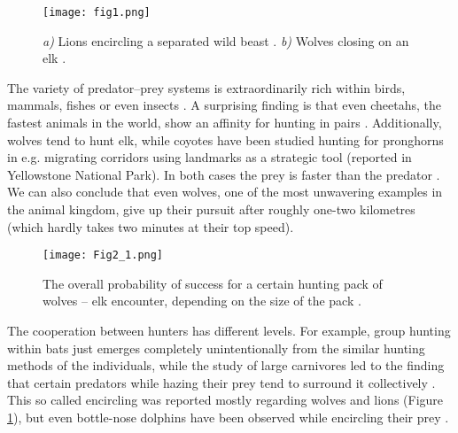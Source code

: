\documentclass[12pt,a4paper,final]{iopart}
\begin{document}
\begin{figure}
\begin{center}
\texttt{[image: fig1.png]}
\caption{{\it a)} Lions encircling a separated wild beast \cite{fig11}. {\it b)} Wolves closing on an elk \cite{fig12}.}
\label{fig:encirc}
\end{center}
\vspace{1pt}
\end{figure} 

The variety of predator--prey systems is extraordinarily rich within birds, mammals, fishes or even insects \cite{mech2010wolves, lopez2006bottlenose, boesch1989hunting, bednarz1988cooperative, eaton1970hunting, kim2005cooperative}. A surprising finding is that even cheetahs, the fastest animals in the world, show an affinity for hunting in pairs \cite{eaton1970hunting, packer1988evolution}. Additionally, wolves tend to hunt elk, while coyotes have been studied hunting for pronghorns in e.g. migrating corridors using landmarks as a strategic tool (reported in Yellowstone National Park). In both cases the prey is faster than the predator \cite{mech2010wolves, macnulty2014influence}. We can also conclude that even wolves, one of the most unwavering examples in the animal kingdom, give up their pursuit after roughly one-two kilometres (which hardly takes two minutes at their top speed).

\begin{figure}[b]
\begin{center}
\texttt{[image: Fig2\_1.png]}
\caption{The overall probability of success for a certain hunting pack of wolves -- elk encounter, depending on the size of the pack \cite{macnulty2011nonlinear}.}
\label{fig:optimalgroupsize}
\end{center}
\end{figure} 

The cooperation between hunters has different levels. For example, group hunting within bats just emerges completely unintentionally from the similar hunting methods of the individuals, while the study of large carnivores led to the finding that certain predators while hazing their prey tend to surround it collectively \cite{bailey2013group, brosnan2010cooperation}. This so called encircling was reported mostly regarding wolves and lions (Figure \ref{fig:encirc}), but even bottle-nose dolphins have been observed while encircling their prey \cite{lopez2006bottlenose, stander1992cooperative, packer1988evolution}.
\end{document}

